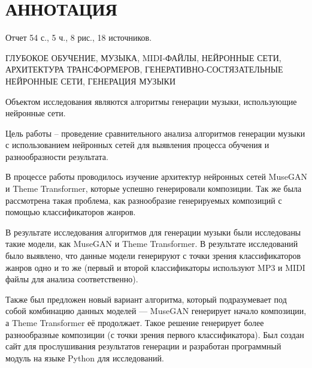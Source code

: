 \chapter*{АННОТАЦИЯ}
Отчет 54 с., 5 ч., 8 рис., 18 источников.

ГЛУБОКОЕ ОБУЧЕНИЕ, МУЗЫКА, MIDI-ФАЙЛЫ, НЕЙРОННЫЕ СЕТИ, АРХИТЕКТУРА ТРАНСФОРМЕРОВ, ГЕНЕРАТИВНО-СОСТЯЗАТЕЛЬНЫЕ НЕЙРОННЫЕ СЕТИ, ГЕНЕРАЦИЯ МУЗЫКИ

Объектом исследования являются алгоритмы генерации музыки, использующие нейронные сети.

Цель работы – проведение сравнительного анализа алгоритмов генерации музыки с использованием нейронных сетей для выявления процесса обучения и разнообразности результата.

В процессе работы проводилось изучение архитектур нейронных сетей MuseGAN и Theme Transformer, которые успешно генерировали композиции. Так же была рассмотрена такая проблема, как разнообразие генерируемых композиций с помощью классификаторов жанров. 

В результате исследования алгоритмов для генерации музыки были исследованы такие модели, как MuseGAN и Theme Transformer. В результате исследований было выявлено, что данные модели генерируют с точки зрения классификаторов жанров одно и то же (первый и второй классификаторы используют MP3 и MIDI файлы для анализа соответственно).

Также был предложен новый вариант алгоритма, который подразумевает под собой комбинацию данных моделей — MuseGAN генерирует начало композиции, а Theme Transformer её продолжает. Такое решение генерирует более разнообразные композиции (с точки зрения первого классификатора). Был создан сайт для прослушивания результатов генерации и разработан программный модуль на языке Python для исследований. 
